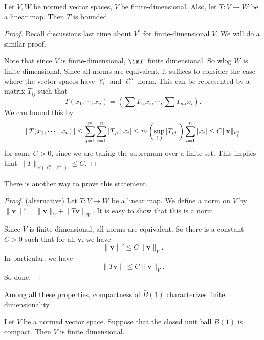\documentclass[a4paper]{article}
\begin{document}
\begin{prop}
  Let $V, W$ be normed vector spaces, $V$ be finite-dimensional. Also, let $T: V\to W$ be a linear map. Then $T$ is bounded.
\end{prop}

\begin{proof}
  Recall discussions last time about $V^*$ for finite-dimensional $V$. We will do a similar proof.

  Note that since $V$ is finite-dimensional, $\im T$ finite dimensional. So wlog $W$ is finite-dimensional. Since all norms are equivalent, it suffices to consider the case where the vector spaces have $\ell_1^n$ and $\ell_1^m$ norm. This can be represented by a matrix $T_{ij}$ such that
  \[
    T(x_1, \cdots, x_n) = \left(\sum T_{1i}x_i, \cdots, \sum T_{mi}x_i\right).
  \]
  We can bound this by
  \[
    \|T(x_1, \cdots, x_n)\| \leq \sum_{j = 1}^m \sum_{i = 1}^n |T_{ji}||x_i|\\ \leq m \left(\sup_{i, j}|T_{ij}|\right) \sum_{i = 1}^n |x_i| \leq C \|\mathbf{x}\|_{\ell_1^n}
  \]
  for some $C > 0$, since we are taking the supremum over a finite set. This implies that $\|T\|_{\mathcal{B}(\ell_1^n, \ell_1^m)} \leq C$.
\end{proof}

There is another way to prove this statement.
\begin{proof}(alternative)
  Let $T: V\to W$ be a linear map. We define a norm on $V$ by $\|\mathbf{v}\|' = \|\mathbf{v}\|_V + \| T \mathbf{v}\|_W$. It is easy to show that this is a norm.

  Since $V$ is finite dimensional, all norms are equivalent. So there is a constant $C>0$ such that for all $\mathbf{v}$, we have
  \[
    \|\mathbf{v}\|' \leq C\|\mathbf{v}\|_V.
  \]
  In particular, we have
  \[
    \|T\mathbf{v}\| \leq C\|\mathbf{v}\|_V.
  \]
  So done.
\end{proof}

Among all these properties, compactness of $\bar{B}(1)$ characterizes finite dimensionality.
\begin{prop}
  Let $V$ be a normed vector space. Suppose that the closed unit ball $\bar{B}(1)$ is compact. Then $V$ is finite dimensional.
\end{prop}
\end{document}
